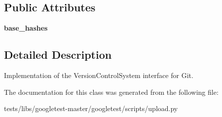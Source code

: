 \subsection*{Public Attributes}
\begin{DoxyCompactItemize}
\item 
\mbox{\label{classtests_1_1libs_1_1googletest-master_1_1googletest_1_1scripts_1_1upload_1_1GitVCS_aedcfae6dce910e1ec5bdfeb496521fcf}} 
{\bfseries base\+\_\+hashes}
\end{DoxyCompactItemize}


\subsection{Detailed Description}
\begin{DoxyVerb}Implementation of the VersionControlSystem interface for Git.\end{DoxyVerb}
 

The documentation for this class was generated from the following file\+:\begin{DoxyCompactItemize}
\item 
tests/libs/googletest-\/master/googletest/scripts/upload.\+py\end{DoxyCompactItemize}
